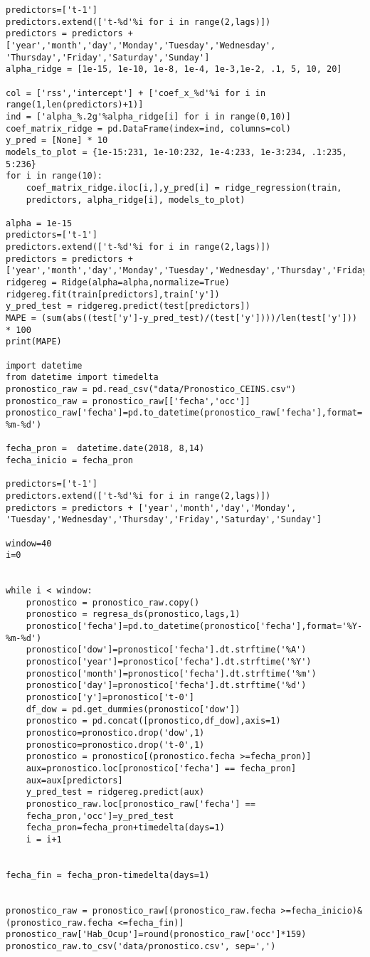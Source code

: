\begin{verbatim}
predictors=['t-1']
predictors.extend(['t-%d'%i for i in range(2,lags)])
predictors = predictors + 
['year','month','day','Monday','Tuesday','Wednesday',
'Thursday','Friday','Saturday','Sunday']
alpha_ridge = [1e-15, 1e-10, 1e-8, 1e-4, 1e-3,1e-2, .1, 5, 10, 20]

col = ['rss','intercept'] + ['coef_x_%d'%i for i in range(1,len(predictors)+1)]
ind = ['alpha_%.2g'%alpha_ridge[i] for i in range(0,10)]
coef_matrix_ridge = pd.DataFrame(index=ind, columns=col)
y_pred = [None] * 10
models_to_plot = {1e-15:231, 1e-10:232, 1e-4:233, 1e-3:234, .1:235, 5:236}
for i in range(10):
    coef_matrix_ridge.iloc[i,],y_pred[i] = ridge_regression(train, 
    predictors, alpha_ridge[i], models_to_plot)
    
alpha = 1e-15
predictors=['t-1']
predictors.extend(['t-%d'%i for i in range(2,lags)])
predictors = predictors + ['year','month','day','Monday','Tuesday','Wednesday','Thursday','Friday','Saturday','Sunday']
ridgereg = Ridge(alpha=alpha,normalize=True)
ridgereg.fit(train[predictors],train['y'])
y_pred_test = ridgereg.predict(test[predictors])
MAPE = (sum(abs((test['y']-y_pred_test)/(test['y'])))/len(test['y'])) * 100
print(MAPE)

import datetime
from datetime import timedelta  
pronostico_raw = pd.read_csv("data/Pronostico_CEINS.csv")
pronostico_raw = pronostico_raw[['fecha','occ']]
pronostico_raw['fecha']=pd.to_datetime(pronostico_raw['fecha'],format='%Y-%m-%d')

fecha_pron =  datetime.date(2018, 8,14)
fecha_inicio = fecha_pron

predictors=['t-1']
predictors.extend(['t-%d'%i for i in range(2,lags)])
predictors = predictors + ['year','month','day','Monday',
'Tuesday','Wednesday','Thursday','Friday','Saturday','Sunday']

window=40
i=0


while i < window:
    pronostico = pronostico_raw.copy()
    pronostico = regresa_ds(pronostico,lags,1)
    pronostico['fecha']=pd.to_datetime(pronostico['fecha'],format='%Y-%m-%d')
    pronostico['dow']=pronostico['fecha'].dt.strftime('%A')
    pronostico['year']=pronostico['fecha'].dt.strftime('%Y')
    pronostico['month']=pronostico['fecha'].dt.strftime('%m')
    pronostico['day']=pronostico['fecha'].dt.strftime('%d')
    pronostico['y']=pronostico['t-0']
    df_dow = pd.get_dummies(pronostico['dow'])
    pronostico = pd.concat([pronostico,df_dow],axis=1)
    pronostico=pronostico.drop('dow',1)
    pronostico=pronostico.drop('t-0',1)
    pronostico = pronostico[(pronostico.fecha >=fecha_pron)]
    aux=pronostico.loc[pronostico['fecha'] == fecha_pron]
    aux=aux[predictors]
    y_pred_test = ridgereg.predict(aux)
    pronostico_raw.loc[pronostico_raw['fecha'] == 
    fecha_pron,'occ']=y_pred_test
    fecha_pron=fecha_pron+timedelta(days=1)
    i = i+1
    

fecha_fin = fecha_pron-timedelta(days=1)


pronostico_raw = pronostico_raw[(pronostico_raw.fecha >=fecha_inicio)&
(pronostico_raw.fecha <=fecha_fin)]     
pronostico_raw['Hab_Ocup']=round(pronostico_raw['occ']*159)
pronostico_raw.to_csv('data/pronostico.csv', sep=',')



\end{verbatim}
